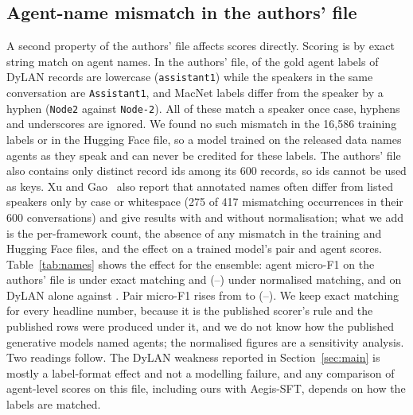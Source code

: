\documentclass[conference]{IEEEtran}
\begin{document}
\subsection{Agent-name mismatch in the authors' file}\label{sec:names}
A second property of the authors' file affects scores directly. Scoring is by exact string match on agent names. In the authors' file, \nmDyMis{} of the \nmDyTot{} gold agent labels of DyLAN records are lowercase (\texttt{assistant1}) while the speakers in the same conversation are \texttt{Assistant1}, and \nmMacMis{} MacNet labels differ from the speaker by a hyphen (\texttt{Node2} against \texttt{Node-2}). All of these match a speaker once case, hyphens and underscores are ignored. We found no such mismatch in the 16,586 training labels or in the Hugging Face file, so a model trained on the released data names agents as they speak and can never be credited for these labels. The authors' file also contains only \nmDistinctIds{} distinct record ids among its 600 records, so ids cannot be used as keys. Xu and Gao~\cite{audit2} also report that annotated names often differ from listed speakers only by case or whitespace (275 of 417 mismatching occurrences in their 600 conversations) and give results with and without normalisation; what we add is the per-framework count, the absence of any mismatch in the training and Hugging Face files, and the effect on a trained model's pair and agent scores. Table~\ref{tab:names} shows the effect for the ensemble: agent micro-F1 on the authors' file is \nmAgentExact{} under exact matching and \nmAgentNorm{} (\nmAgentNormLo--\nmAgentNormHi) under normalised matching, and on DyLAN alone \nmDyAgentExact{} against \nmDyAgentNorm. Pair micro-F1 rises from \ensAEpair{} to \nmPairNorm{} (\nmPairNormLo--\nmPairNormHi). We keep exact matching for every headline number, because it is the published scorer's rule and the published rows were produced under it, and we do not know how the published generative models named agents; the normalised figures are a sensitivity analysis. Two readings follow. The DyLAN weakness reported in Section~\ref{sec:main} is mostly a label-format effect and not a modelling failure, and any comparison of agent-level scores on this file, including ours with Aegis-SFT, depends on how the labels are matched.





\end{document}
